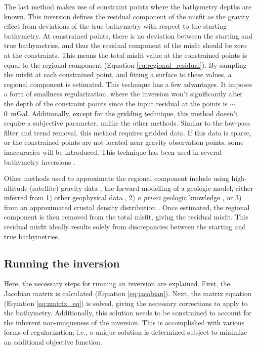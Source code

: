 \begin{enumerate}
        The last method makes use of constraint points where the bathymetry depths are known. This inversion defines the residual component of the misfit as the gravity effect from deviations of the true bathymetry with respect to the starting bathymetry. At constrained points, there is no deviation between the starting and true bathymetries, and thus the residual component of the misfit should be zero at the constraints. This means the total misfit value at the constrained points is equal to the regional component (Equation \ref{eq:regional_residual}). By sampling the misfit at each constrained point, and fitting a surface to these values, a regional component is estimated. This technique has a few advantages. It imposes a form of smallness regularization, where the inversion won't significantly alter the depth of the constraint points since the input residual at the points is $\sim$0~mGal. Additionally, except for the gridding technique, this method doesn't require a subjective parameter, unlike the other methods. Similar to the low-pass filter and trend removal, this method requires gridded data. If this data is sparse, or the constrained points are not located near gravity observation points, some inaccuracies will be introduced. This technique has been used in several bathymetry inversions \citep{millanconstraining2020, yangbathymetry2021, anbathymetry2019}.
        
\end{enumerate}

Other methods used to approximate the regional component include using high-altitude (satellite) gravity data \citep{mutosubglacial2016, tintobathymetry2015}, the forward modelling of a geologic model, either inferred from 1) other geophysical data \citep{hodgsonfuture2019}, 2) \textit{a priori} geologic knowledge \citep{tintoprogressive2011}, or 3) from an approximated crustal density distribution \citep{tintoross2019, cochrandetailed2020}. Once estimated, the regional component is then removed from the total misfit, giving the residual misfit. This residual misfit ideally results solely from discrepancies between the starting and true bathymetries. 

\subsection{Running the inversion}

Here, the necessary steps for running an inversion are explained. First, the Jacobian matrix is calculated (Equation \ref{eq:jacobian}). Next, the matrix equation (Equation \ref{eq:matrix_eq}) is solved, giving the necessary corrections to apply to the bathymetry. Additionally, this solution needs to be constrained to account for the inherent non-uniqueness of the inversion. This is accomplished with various forms of regularization; i.e., a unique solution is determined subject to minimize an additional objective function.

